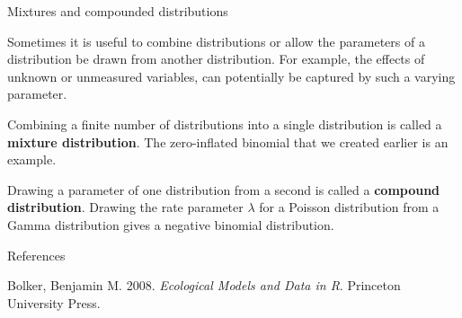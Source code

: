 \documentclass[
  ignorenonframetext,
]{beamer}
\begin{document}
\begin{frame}{Mixtures and compounded distributions}
\protect\hypertarget{mixtures-and-compounded-distributions}{}

Sometimes it is useful to combine distributions or allow the parameters
of a distribution be drawn from another distribution. For example, the
effects of unknown or unmeasured variables, can potentially be captured
by such a varying parameter.

Combining a finite number of distributions into a single distribution is
called a \textbf{mixture distribution}. The zero-inflated binomial that
we created earlier is an example.

Drawing a parameter of one distribution from a second is called a
\textbf{compound distribution}. Drawing the rate parameter \(\lambda\)
for a Poisson distribution from a Gamma distribution gives a negative
binomial distribution.

\end{frame}

\begin{frame}{References}
\protect\hypertarget{references}{}

\hypertarget{refs}{}
\leavevmode\hypertarget{ref-bolker}{}%
Bolker, Benjamin M. 2008. \emph{Ecological Models and Data in R}.
Princeton University Press.

\end{frame}
\end{document}
